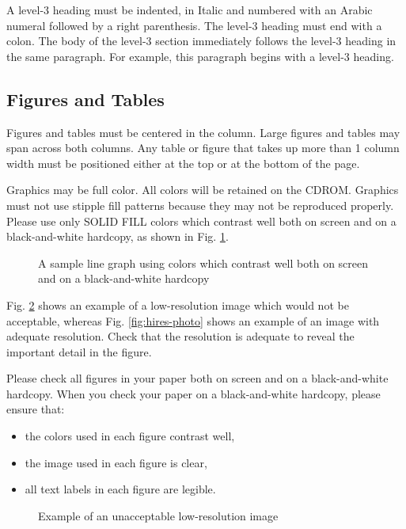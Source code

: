 \documentclass[10pt,conference,letterpaper]{IEEEtran}
\begin{document}
A level-3 heading must be indented, in Italic and numbered with an
Arabic numeral followed by a right parenthesis. The level-3 heading
must end with a colon.  The body of the level-3 section immediately
follows the level-3 heading in the same paragraph.  For example, this
paragraph begins with a level-3 heading.

\subsection{Figures and Tables}

Figures and tables must be centered in the column.  Large figures and
tables may span across both columns.  Any table or figure that takes
up more than 1 column width must be positioned either at the top or at
the bottom of the page.

Graphics may be full color.  All colors will be retained on the CDROM.
Graphics must not use stipple fill patterns because they may not be
reproduced properly.  Please use only SOLID FILL colors which contrast
well both on screen and on a black-and-white hardcopy, as shown in
Fig.  \ref{fig:sample_graph}.

\begin{figure}[h]
	\caption{A sample line graph using colors which contrast well both on screen and on a black-and-white hardcopy}
	\label{fig:sample_graph}
\end{figure}

Fig. \ref{fig:lores-photo} shows an example of a low-resolution image
which would not be acceptable, whereas Fig.  \ref{fig:hires-photo}
shows an example of an image with adequate resolution.  Check that the
resolution is adequate to reveal the important detail in the figure.

Please check all figures in your paper both on screen and on a
black-and-white hardcopy.  When you check your paper on a
black-and-white hardcopy, please ensure that:

\begin{itemize}
\item	the colors used in each figure contrast well,
\item	the image used in each figure is clear,
\item	all text labels in each figure are legible.
\end{itemize}

\begin{figure}[h]
	\caption{Example of an unacceptable low-resolution image}
	\label{fig:lores-photo}
\end{figure}
\end{document}

